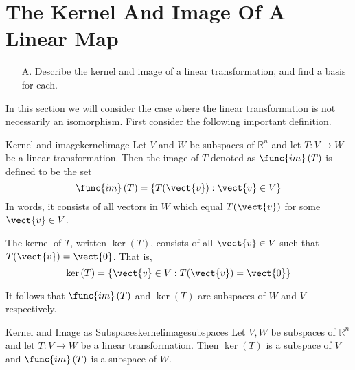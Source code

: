 \section{The Kernel And Image Of A Linear Map}

\begin{outcome}
\begin{enumerate}
\item[A.]  Describe the kernel and image of a linear transformation, and find a basis for each. 
\end{enumerate}
\end{outcome}

In this section we will consider the case where the linear transformation is not necessarily an
isomorphism. First consider the following important definition.

\begin{definition}{Kernel and image}{kernelimage}
Let $V$ and $W$ be subspaces of $\mathbb{R}^n$ and let $T:V\mapsto W$ be a linear transformation. Then the image of $T$
denoted as $\func{im}\left( T\right) $ is defined to be the set 
\begin{equation*}
\func{im}\left( T\right) = \left\{T (\vect{v}):\vect{v}\in V\right\}
\end{equation*}
In words, it consists of all vectors in $W$ which equal $T(\vect{v})$ for some $
\vect{v}\in V$.

The kernel of $T$, written $\ker \left( T\right) $, consists of all $\vect{v}\in V$ such that $T(\vect{v})=\vect{0}$. That is, 
\begin{equation*}
\ker \left( T\right) =\left\{ \vect{v}\in V:T(\vect{v})=\vect{0}\right\}
\end{equation*}
\end{definition}

It follows that $\func{im}\left( T\right) $ and $\ker \left( T\right) $
are subspaces of $W$ and $V$ respectively.

\begin{proposition}{Kernel and Image as Subspaces}{kernelimagesubspaces}
Let $V, W$ be subspaces of $\mathbb{R}^n$ and let $T:V\rightarrow W$ be a linear transformation. Then $\ker \left(
T\right) $ is a subspace of $V$ and $\func{im}\left( T\right) $ is a
subspace of $W$.
\end{proposition}

